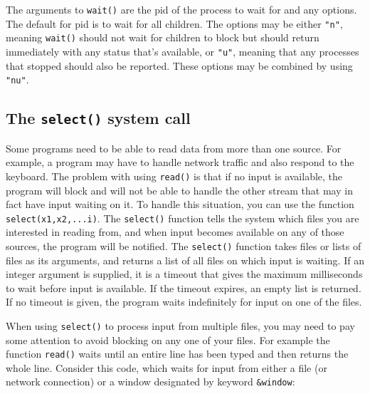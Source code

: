 The arguments to \texttt{wait()} are the pid of the process to wait for
and any options. The default for pid is to wait for all children. The
options may be either \texttt{"n"}, meaning
\texttt{wait()} should not wait for children to block but should return
immediately with any status that's available, or
\texttt{"u"}, meaning that any processes
that stopped should also be reported. These options may be combined by
using \texttt{"nu"}.

\subsection{The \texttt{select()} system call}

Some programs need to be able to read data from more than one source.
For example, a program may have to handle network traffic and also
respond to the keyboard. The problem with using
\texttt{read()} is that if no input is available, the program will
block and will not be able to handle the other stream that may in fact
have input waiting on it. To handle this situation, you can use the
function \texttt{select(x1,x2,...i)}. The
\texttt{select()} function tells the system which files
you are interested in reading from, and when input becomes available on
any of those sources, the program will be notified. The
\texttt{select()} function takes files or lists of files as its
arguments, and returns a list of all files on which input is waiting.
If an integer argument is supplied, it is a timeout that gives the
maximum milliseconds to wait before input is available. If the timeout
expires, an empty list is returned. If no timeout is given, the program
waits indefinitely for input on one of the files.


When using \texttt{select()} to process input from multiple files, you
may need to pay some attention to avoid blocking on any one of your
files. For example the function \texttt{read()} waits until an entire
line has been typed and then returns the whole line. Consider this
code, which waits for input from either a file (or network connection)
or a window designated by keyword \texttt{\&window}:

